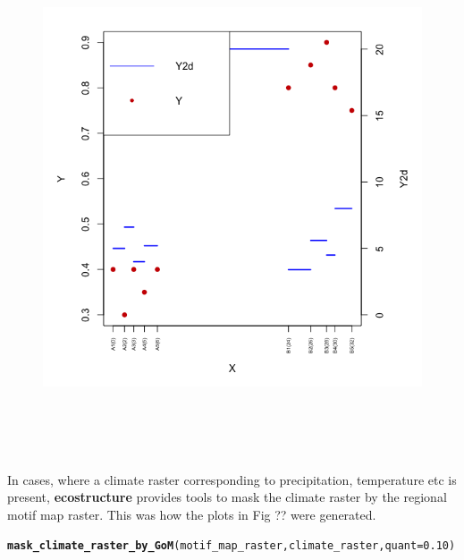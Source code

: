 \documentclass[12pt]{article}\usepackage[]{graphicx}\usepackage[usenames,dvipsnames]{color}
\makeatletter
\newcommand{\hlnum}[1]{\textcolor[rgb]{0.686,0.059,0.569}{#1}}%
\newcommand{\hlstd}[1]{\textcolor[rgb]{0.345,0.345,0.345}{#1}}%
\newcommand{\hlkwc}[1]{\textcolor[rgb]{0.333,0.667,0.333}{#1}}%
\newcommand{\hlkwd}[1]{\textcolor[rgb]{0.737,0.353,0.396}{\textbf{#1}}}%
\newenvironment{kframe}{%
 \def\at@end@of@kframe{}%
 \ifinner\ifhmode%
  \def\at@end@of@kframe{\end{minipage}}%
  \begin{minipage}{\columnwidth}%
 \fi\fi%
 \def\FrameCommand##1{\hskip\@totalleftmargin \hskip-\fboxsep
 \colorbox{shadecolor}{##1}\hskip-\fboxsep
     \hskip-\linewidth \hskip-\@totalleftmargin \hskip\columnwidth}%
 \MakeFramed {\advance\hsize-\width
   \@totalleftmargin\z@ \linewidth\hsize
   \@setminipage}}%
 {\par\unskip\endMakeFramed%
 \at@end@of@kframe}
\newenvironment{knitrout}{}{} %
\makeatother
\begin{document}
\begin{figure}[htp]
\begin{center}
\includegraphics[width=6in,height=6in]{figure/topic-meta-diversity.png}
\end{center}
\end{figure}

In cases, where a climate raster corresponding to precipitation, temperature etc is present, \textbf{ecostructure} provides tools to mask the climate raster by the
regional motif map raster. This was how the plots in Fig ?? were generated.

\begin{knitrout}
\color{fgcolor}\begin{kframe}
\begin{alltt}
\hlkwd{mask_climate_raster_by_GoM}\hlstd{(motif_map_raster, climate_raster,} \hlkwc{quant} \hlstd{=} \hlnum{0.10}\hlstd{)}
\end{alltt}
\end{kframe}
\end{knitrout}
\end{document}
